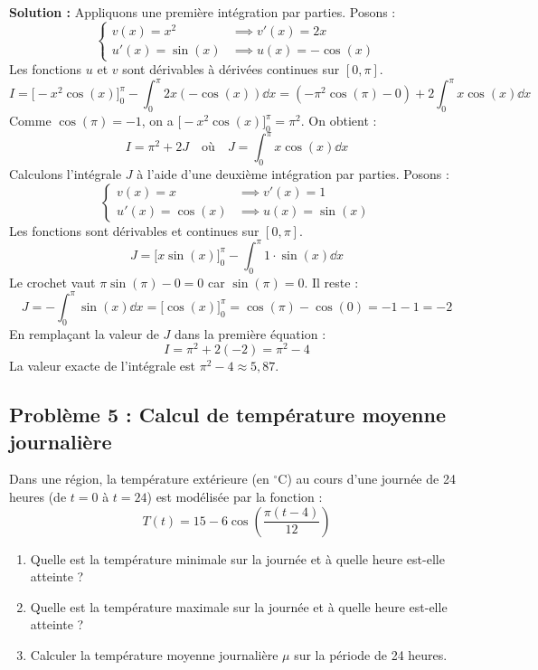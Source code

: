 \textbf{Solution :}
Appliquons une première intégration par parties. Posons :
\[
\begin{cases}
v(x) = x^2 & \implies v'(x) = 2x \\
u'(x) = \sin(x) & \implies u(x) = -\cos(x)
\end{cases}
\]
Les fonctions $u$ et $v$ sont dérivables à dérivées continues sur $[0, \pi]$.
\[
I = \Big[ -x^2 \cos(x) \Big]_0^{\pi} - \int_0^{\pi} 2x (-\cos(x)) \dd x = \left( -\pi^2 \cos(\pi) - 0 \right) + 2 \int_0^{\pi} x \cos(x) \dd x
\]
Comme $\cos(\pi) = -1$, on a $\Big[ -x^2 \cos(x) \Big]_0^{\pi} = \pi^2$.
On obtient :
\[
I = \pi^2 + 2 J \quad \text{où} \quad J = \int_0^{\pi} x \cos(x) \dd x
\]
Calculons l'intégrale $J$ à l'aide d'une deuxième intégration par parties. Posons :
\[
\begin{cases}
v(x) = x & \implies v'(x) = 1 \\
u'(x) = \cos(x) & \implies u(x) = \sin(x)
\end{cases}
\]
Les fonctions sont dérivables et continues sur $[0, \pi]$.
\[
J = \Big[ x \sin(x) \Big]_0^{\pi} - \int_0^{\pi} 1 \cdot \sin(x) \dd x
\]
Le crochet vaut $\pi \sin(\pi) - 0 = 0$ car $\sin(\pi) = 0$.
Il reste :
\[
J = -\int_0^{\pi} \sin(x) \dd x = \Big[ \cos(x) \Big]_0^{\pi} = \cos(\pi) - \cos(0) = -1 - 1 = -2
\]
En remplaçant la valeur de $J$ dans la première équation :
\[
I = \pi^2 + 2(-2) = \pi^2 - 4
\]
La valeur exacte de l'intégrale est $\pi^2 - 4 \approx 5,87$.

\subsection*{Problème 5 : Calcul de température moyenne journalière}
Dans une région, la température extérieure (en $^\circ$C) au cours d'une journée de 24 heures (de $t=0$ à $t=24$) est modélisée par la fonction :
\[
T(t) = 15 - 6 \cos\left( \frac{\pi(t - 4)}{12} \right)
\]
\begin{enumerate}
    \item Quelle est la température minimale sur la journée et à quelle heure est-elle atteinte ?
    \item Quelle est la température maximale sur la journée et à quelle heure est-elle atteinte ?
    \item Calculer la température moyenne journalière $\mu$ sur la période de 24 heures.
\end{enumerate}

